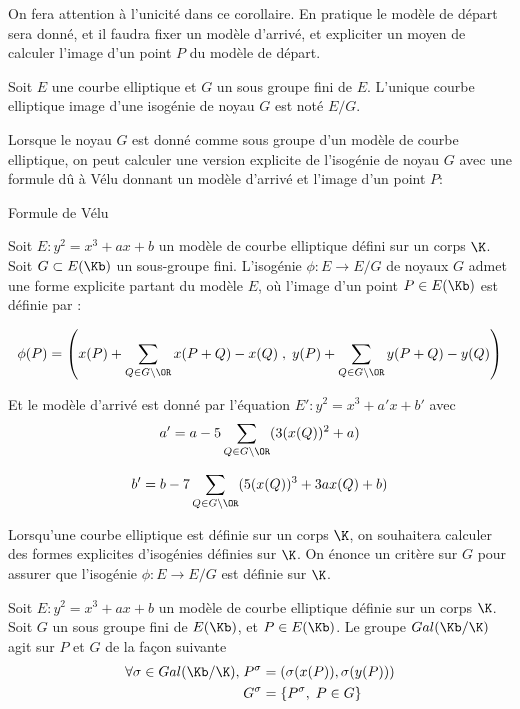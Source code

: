 \begin{Rem}
	On fera attention à l'unicité dans ce corollaire. En pratique le modèle de départ sera donné, et il faudra fixer un modèle d'arrivé, et expliciter un moyen de calculer l'image d'un point $P$ du modèle de départ. 
\end{Rem} 

\begin{Def}
	Soit $E$ une courbe elliptique et $G$ un sous groupe fini de $E$. L'unique courbe elliptique image d'une isogénie de noyau $G$ est noté $E/G$.
\end{Def}

Lorsque le noyau $G$ est donné comme sous groupe d'un modèle de courbe elliptique, on peut calculer une version explicite de l'isogénie de noyau $G$ avec une formule dû à Vélu donnant un modèle d'arrivé et l'image d'un point $P$:

\begin{Prop}{Formule de Vélu}\cite{Velu71}
	
	Soit $E : y^2 = x^3 + ax + b$ un modèle de courbe elliptique défini sur un corps $\K$. Soit $G\subset E(\Kb)$ un sous-groupe fini. L'isogénie $\phi : E\rightarrow E/G$ de noyaux $G$ admet une forme explicite partant du modèle $E$, où l'image d'un point $P\in E(\Kb)$ est définie par :
	
	\begin{equation*}
		\phi(P) = \left( x(P) + \sum_{Q\in G\setminus{\OR}} x(P+Q) - x(Q)\;,\;y(P) + \sum_{Q\in G\setminus{\OR}} y(P+Q) - y(Q)\right) 
	\end{equation*} 
	
	Et le modèle d'arrivé est donné par l'équation $E' : y^2 = x^3 + a'x + b'$ avec
	\begin{equation*}
		a' = a - 5\sum_{Q\in G\setminus{\OR}}(3 (x(Q))^2 + a )
	\end{equation*}
	
	\begin{equation*}
		b' = b - 7\sum_{Q\in G\setminus{\OR}}(5 (x(Q))^3 + 3ax(Q) + b )
	\end{equation*}
\end{Prop}

Lorsqu'une courbe elliptique est définie sur un corps $\K$, on souhaitera calculer des formes explicites d'isogénies définies sur $\K$. On énonce un critère sur $G$ pour assurer que l'isogénie $\phi : E\rightarrow E/G$ est définie sur $\K$.

\begin{Def}
	Soit $E : y^2 = x^3 + ax + b$ un modèle de courbe elliptique définie sur un corps $\K$. Soit $G$ un sous groupe fini de $E(\Kb)$, et $P\in E(\Kb)$. Le groupe $Gal(\Kb/\K)$ agit sur $P$ et $G$ de la façon suivante
	\begin{align*}
		\forall\sigma\in Gal(\Kb/\K),\;& P^{\sigma} = \left( \sigma(x(P)), \sigma(y(P))\right)\\
		& G^{\sigma} = \left\lbrace P^{\sigma},\; P\in G \right\rbrace 
	\end{align*}
	
	
\end{Def}


